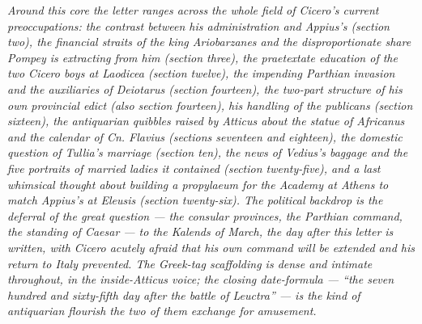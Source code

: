 \textit{Around this core the letter ranges across the
whole field of Cicero's current preoccupations: the
contrast between his administration and Appius's
(section two), the financial straits of the king
Ariobarzanes and the disproportionate share Pompey is
extracting from him (section three), the praetextate
education of the two Cicero boys at Laodicea (section
twelve), the impending Parthian invasion and the
auxiliaries of Deiotarus (section fourteen), the
two-part structure of his own provincial edict
(also section fourteen), his handling of the publicans
(section sixteen), the antiquarian quibbles raised by
Atticus about the statue of Africanus and the calendar
of Cn. Flavius (sections seventeen and eighteen), the
domestic question of Tullia's marriage (section ten),
the news of Vedius's baggage and the five portraits of
married ladies it contained (section twenty-five),
and a last whimsical thought about building a propylaeum
for the Academy at Athens to match Appius's at Eleusis
(section twenty-six). The political backdrop is the
deferral of the great question --- the consular
provinces, the Parthian command, the standing of
Caesar --- to the Kalends of March, the day after this
letter is written, with Cicero acutely afraid that his
own command will be extended and his return to Italy
prevented. The Greek-tag scaffolding is dense and
intimate throughout, in the inside-Atticus voice;
the closing date-formula --- ``the seven hundred and
sixty-fifth day after the battle of Leuctra'' --- is
the kind of antiquarian flourish the two of them
exchange for amusement.}
